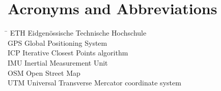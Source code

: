 \section*{Acronyms and Abbreviations}
\begin{tabbing}
 \hspace*{1.6cm}  \= \kill
 ETH \> Eidgenössische Technische Hochschule \\[0.5ex]
 GPS \> Global Positioning System \\[0.5ex]
 ICP \> Iterative Closest Points algorithm\\[0.5ex]
 IMU \> Inertial Measurement Unit \\[0.5ex]
 OSM \> Open Street Map \\[0.5ex]
 UTM \> Universal Transverse Mercator coordinate system\\[0.5ex]

\end{tabbing}